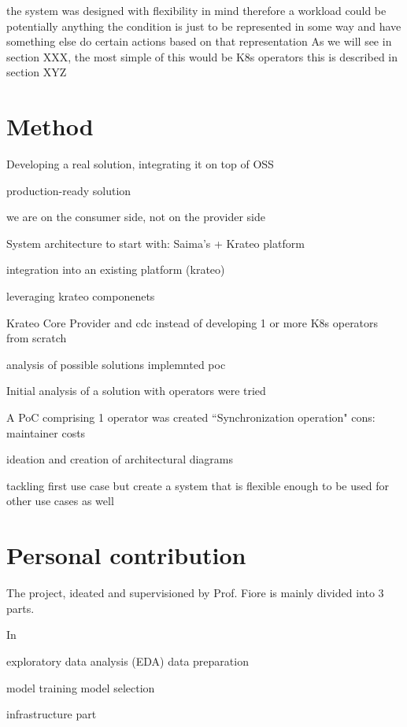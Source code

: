 the system was designed with flexibility in mind therefore a workload could be potentially anything
the condition is just to be represented in some way and have something else do certain actions based on that representation
As we will see in section XXX, the most simple of this would be K8s operators
this is described in section XYZ

\section{Method}

Developing a real solution, integrating it on top of OSS

production-ready solution

we are on the consumer side, not on the provider side

System architecture to start with: Saima's + Krateo platform

integration into an existing platform (krateo)


leveraging krateo componenets

Krateo Core Provider and cdc instead of developing 1 or more K8s operators from scratch


analysis of possible solutions
implemnted poc 

Initial analysis of a solution with operators were tried

A PoC comprising 1 operator was created 
``Synchronization operation"
cons: maintainer costs



ideation and creation of architectural diagrams



tackling first use case
but create a system that is flexible enough to be used for other use cases as well

\section{Personal contribution}

The project, ideated and supervisioned by Prof. Fiore is mainly divided into 3 parts.

In 

exploratory data analysis (EDA)
data preparation

model training
model selection

infrastructure part





